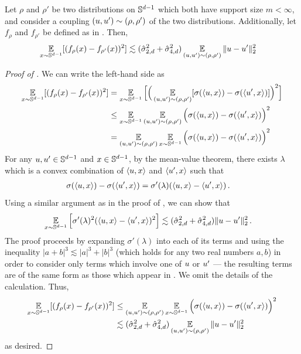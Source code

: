 \begin{lemma} \label{lemma:point_error_to_fn_error}
Let $\rho$ and $\rho'$ be two distributions on $\mathbb{S}^{d - 1}$ which both have support size $m < \infty$, and consider a coupling $(u, u') \sim (\rho, \rho')$ of the two distributions. Additionally, let $f_\rho$ and $f_{\rho'}$ be defined as in . Then,
\begin{align}
\operatorname*{\mathbb{E}}_{x \sim \mathbb{S}^{d - 1}} [(f_\rho(x) - f_{\rho'}(x))^2]
& \lesssim (\hat{\sigma}_{2, d}^2 + \hat{\sigma}_{4, d}^2) \operatorname*{\mathbb{E}}_{(u, u') \sim (\rho, \rho')} \|u - u'\|_2^2
\end{align}
\end{lemma}
\begin{proof}[Proof of ]
We can write the left-hand side as
\begin{align}
\operatorname*{\mathbb{E}}_{x \sim \mathbb{S}^{d - 1}} [(f_\rho(x) - f_{\rho'}(x))^2]
& = \operatorname*{\mathbb{E}}_{x \sim \mathbb{S}^{d - 1}} \Big[ \Big( \operatorname*{\mathbb{E}}_{(u, u') \sim (\rho, \rho')}[\sigma(\langle u, x \rangle) - \sigma(\langle u', x \rangle)] \Big)^2 \Big] \\
& \leq \operatorname*{\mathbb{E}}_{x \sim \mathbb{S}^{d - 1}} \operatorname*{\mathbb{E}}_{(u, u') \sim (\rho, \rho')} \Big(\sigma(\langle u, x \rangle) - \sigma(\langle u', x \rangle)\Big)^2 \\
& = \operatorname*{\mathbb{E}}_{(u, u') \sim (\rho, \rho')} \operatorname*{\mathbb{E}}_{x \sim \mathbb{S}^{d - 1}} \Big(\sigma(\langle u, x \rangle) - \sigma(\langle u', x \rangle)\Big)^2
\end{align}
For any $u, u' \in \mathbb{S}^{d - 1}$ and $x \in \mathbb{S}^{d - 1}$, by the mean-value theorem, there exists $\lambda$ which is a convex combination of $\langle u, x \rangle$ and $\langle u', x \rangle$ such that
\begin{align}
\sigma(\langle u, x \rangle) - \sigma(\langle u', x \rangle)
& = \sigma'(\lambda) (\langle u, x \rangle - \langle u', x \rangle) \,.
\end{align}
Using a similar argument as in the proof of , we can show that
\begin{align}
\operatorname*{\mathbb{E}}_{x \sim \mathbb{S}^{d - 1}} \Big[ \sigma'(\lambda)^2 (\langle u, x \rangle - \langle u', x \rangle)^2 \Big] 
& \lesssim (\hat{\sigma}_{2, d}^2 + \hat{\sigma}_{4, d}^2) \|u - u'\|_2^2 \,.
\end{align}
The proof proceeds by expanding $\sigma'(\lambda)$ into each of its terms and using the inequality $|a + b|^3 \lesssim |a|^3 + |b|^3$ (which holds for any two real numbers $a, b$) in order to consider only terms which involve one of $u$ or $u'$ --- the resulting terms are of the same form as those which appear in . We omit the details of the calculation. Thus,
\begin{align}
\operatorname*{\mathbb{E}}_{x \sim \mathbb{S}^{d - 1}} [(f_\rho(x) - f_{\rho'}(x))^2]
& \leq \operatorname*{\mathbb{E}}_{(u, u') \sim (\rho, \rho')} \operatorname*{\mathbb{E}}_{x \sim \mathbb{S}^{d - 1}} \Big(\sigma(\langle u, x \rangle) - \sigma(\langle u', x \rangle)\Big)^2 \\
& \lesssim (\hat{\sigma}_{2, d}^2 + \hat{\sigma}_{4, d}^2) \operatorname*{\mathbb{E}}_{(u, u') \sim (\rho, \rho')} \|u - u'\|_2^2
\end{align}
as desired.
\end{proof}